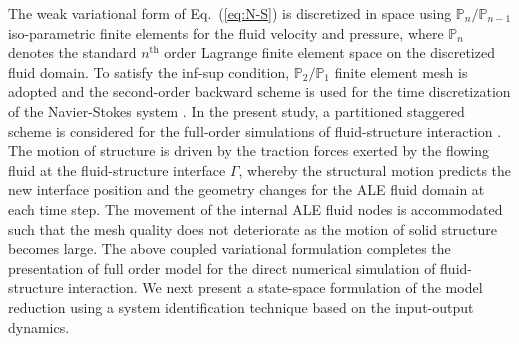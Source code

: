 \documentclass{jfm}
\begin{document}
%
The weak variational form of Eq.~(\ref{eq:N-S}) is discretized in space 
using $\mathbb{P}_{n}/\mathbb{P}_{n-1}$ iso-parametric finite elements 
for the fluid velocity and pressure, where 
$\mathbb{P}_{n}$ denotes the standard $n^\mathrm{th}$
order Lagrange finite element space on the discretized fluid domain. 
%
To satisfy the inf-sup condition, $\mathbb{P}_{2}/\mathbb{P}_{1}$ finite element 
mesh is adopted and the second-order backward scheme is used for the time discretization 
of the Navier-Stokes system \citep{Liu2014}. 
In the present study, a partitioned staggered scheme is considered for the 
full-order simulations of fluid-structure interaction \citep{Jaiman2011}.
The motion of structure is driven by the traction forces exerted 
by the flowing fluid at the fluid-structure interface $\Gamma$, whereby 
the structural motion predicts the new interface position and the geometry changes 
for the ALE fluid domain at each time step. The movement of
the internal ALE fluid nodes is accommodated such that the mesh quality 
does not deteriorate as the motion of solid structure becomes large.
%
The above coupled variational formulation completes the presentation 
of full order model for the direct numerical simulation of fluid-structure interaction. 
We next present a state-space formulation of the model reduction using 
a system identification technique based on the input-output dynamics.
%
\end{document}
